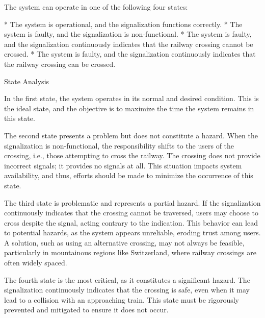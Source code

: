 The system can operate in one of the following four states:

\begitems
* The {\sbf system is operational}, and the signalization functions correctly.
* The system is faulty, and the {\sbf signalization is non-functional}.
* The system is faulty, and the signalization continuously indicates that the railway crossing {\sbf cannot be crossed}.
* The system is faulty, and the signalization continuously indicates that the railway crossing {\sbf can be crossed}.
\enditems

\secc State Analysis

In the {\sbf first state}, the system operates in its normal and desired condition. This is the ideal state, and the objective is to maximize the time the system remains in this state.

The {\sbf second state} presents a problem but does not constitute a hazard. When the signalization is non-functional, the responsibility shifts to the users of the crossing, i.e., those attempting to cross the railway. The crossing does not provide incorrect signals; it provides no signals at all. This situation impacts system availability, and thus, efforts should be made to minimize the occurrence of this state.

The {\sbf third state} is problematic and represents a partial hazard. If the signalization continuously indicates that the crossing cannot be traversed, users may choose to cross despite the signal, acting contrary to the indication. This behavior can lead to potential hazards, as the system appears unreliable, eroding trust among users. A solution, such as using an alternative crossing, may not always be feasible, particularly in mountainous regions like Switzerland, where railway crossings are often widely spaced.

The {\sbf fourth state} is the most critical, as it constitutes a significant hazard. The signalization continuously indicates that the crossing is safe, even when it may lead to a collision with an approaching train. This state must be rigorously prevented and mitigated to ensure it does not occur.